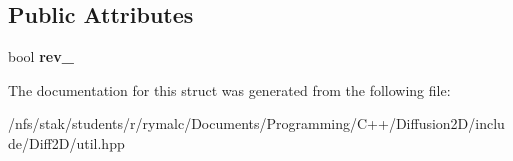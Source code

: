 \subsection*{Public Attributes}
\begin{DoxyCompactItemize}
\item 
\hypertarget{structEdgeError_a704a81b20878f5b534df310ea179ae02}{bool {\bfseries rev\+\_\+}}\label{structEdgeError_a704a81b20878f5b534df310ea179ae02}

\end{DoxyCompactItemize}


The documentation for this struct was generated from the following file\+:\begin{DoxyCompactItemize}
\item 
/nfs/stak/students/r/rymalc/\+Documents/\+Programming/\+C++/\+Diffusion2\+D/include/\+Diff2\+D/util.\+hpp\end{DoxyCompactItemize}
